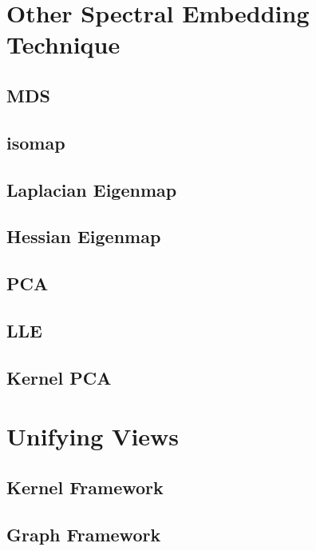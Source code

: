 \section{Other Spectral Embedding Technique}
\label{sec:nldr}

\subsection{MDS}
\label{sec:mds}

\subsection{isomap}
\label{sec:isomap}


\subsection{Laplacian Eigenmap}
\label{sec:lemap}

\subsection{Hessian Eigenmap}
\label{sec:hemap}

\subsection{PCA}
\label{sec:pca}

\subsection{LLE}
\label{sec:lle}

\subsection{Kernel PCA}
\label{sec:kpca}

\section{Unifying Views}

\subsection{Kernel Framework}
\label{sec:kfx}

\subsection{Graph Framework}
\label{sec:gfx}

